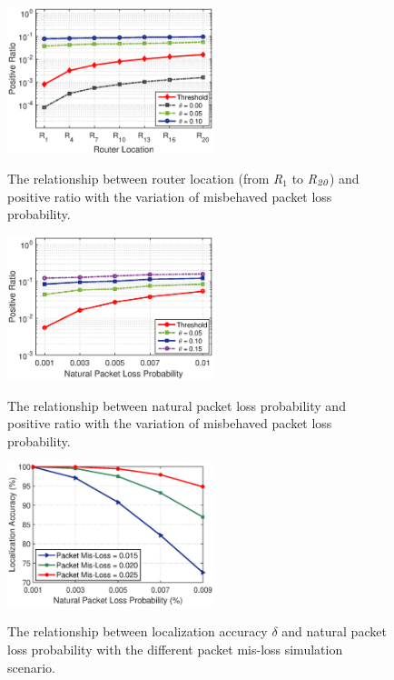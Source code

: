 \begin{figure}%
  \centering
  \includegraphics[width=6cm]{code_matlab/positiveratio11.eps}\\
  \caption{The relationship between router location (from \emph{R}$_1$ to \emph{R}$_\emph{20}$) and positive ratio with the variation of misbehaved packet loss probability.}\label{positiveratio}
\end{figure}
\begin{figure}%
  \centering
  \includegraphics[width=6cm]{code_matlab/positiveratio22.eps}\\
  \caption{The relationship between natural packet loss probability and positive ratio with the variation of misbehaved packet loss probability.}\label{positiveratio2}
\end{figure}
\begin{figure}%
  \centering
  \includegraphics[width=6cm]{code_matlab/localizationaccuracy2.eps}\\
  \caption{The relationship between localization accuracy $\delta$ and natural packet loss probability with the different packet mis-loss simulation scenario.}\label{localizationaccuracyfig2}
\end{figure}
